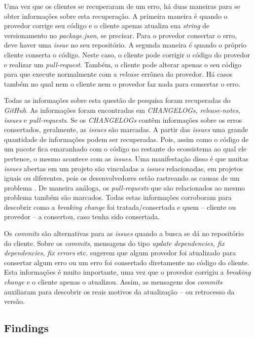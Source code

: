 Uma vez que os clientes se recuperaram de um erro, há duas maneiras para se obter informações sobre esta recuperação. A primeira maneira é quando o provedor corrige seu código e o cliente apenas atualiza sua \textit{string} de versionamento no \textit{package.json}, se precisar. Para o provedor consertar o erro, deve haver uma \textit{issue} no seu repositório. A segunda maneira é quando o próprio cliente conserta o código. Neste caso, o cliente pode corrigir o código do provedor e realizar um \textit{pull-request}. Também, o cliente pode alterar apenas o seu código para que execute normalmente com a \textit{release} errônea do provedor. Há casos também no qual nem o cliente nem o provedor faz nada para consertar o erro.

Todas as informações sobre esta questão de pesquisa foram recuperadas do \textit{GitHub}. As informações foram encontradas em \textit{CHANGELOGs, release-notes, issues} e \textit{pull-requests}. Se os \textit{CHANGELOGs} contêm informações sobre os erros consertados, geralmente, as \textit{issues} são marcadas. A partir das \textit{issues} uma grande quantidade de informações podem ser recuperadas. Pois, assim como o código de um pacote fica emaranhado com o código no restante do ecossistema ao qual ele pertence, o mesmo acontece com as \textit{issues}. Uma manifestação disso é que muitas \textit{issues} abertas em um projeto são vinculadas a \textit{issues} relacionadas, em projetos iguais ou diferentes, pois os desenvolvedores estão rastreando as causas de um problema \cite{Zhang:2018:WIL:3242887.3242891}. De maneira análoga, os \textit{pull-requests} que são relacionados ao mesmo problema também são marcados. Todas estas informações corroboram para descobrir como a \textit{breaking change} foi tratada/consertada e quem -- cliente ou provedor -- a consertou, caso tenha sido consertada.

Os \textit{commits} são alternativas para as \textit{issues} quando a busca se dá no repositório do cliente. Sobre os \textit{commits}, mensagens do tipo \textit{update dependencies, fix dependencies, fix errors} etc. sugerem que algum provedor foi atualizado para consertar algum erro ou um erro foi consertado diretamente no código do cliente. Esta informações é muito importante, uma vez que o provedor corrigiu a \textit{breaking change} e o cliente apenas o atualizou. Assim, as mensagens dos \textit{commits} auxiliaram para descobrir os reais motivos da atualização -- ou retrocesso da versão.

\subsection{Findings}
\label{d_fin:rq3}
